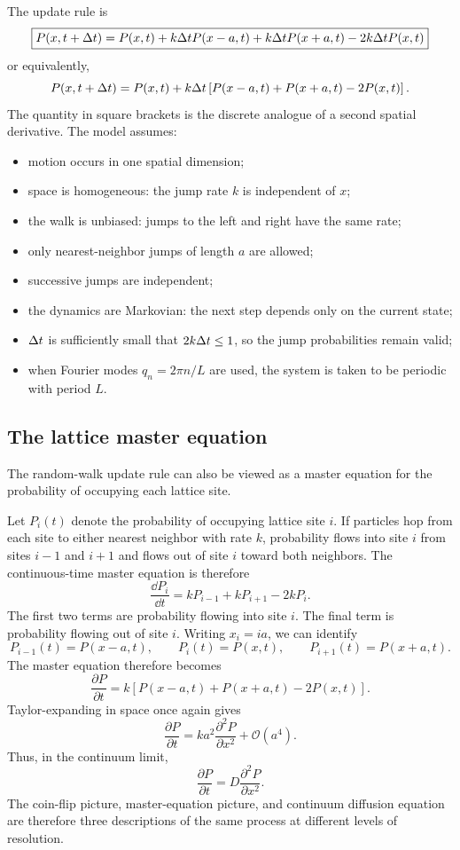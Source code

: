 The update rule is
\[
    \boxed{ P(x,t+\Delta t) = P(x,t) + k\Delta t P(x-a,t) + k\Delta t P(x+a,t) - 2k\Delta t P(x,t) }
\]
or equivalently,
\[
    P(x,t+\Delta t) = P(x,t) + k\Delta t \left[ P(x-a,t) + P(x+a,t) - 2P(x,t) \right].
\]
The quantity in square brackets is the discrete analogue of a second spatial derivative.
% 
% 
The model assumes:
\begin{itemize}
    \item motion occurs in one spatial dimension;
    \item space is homogeneous: the jump rate $k$ is independent of $x$;
    \item the walk is unbiased: jumps to the left and right have the same rate;
    \item only nearest-neighbor jumps of length $a$ are allowed;
    \item successive jumps are independent;
    \item the dynamics are Markovian: the next step depends only on the current state;
    \item $\Delta t$ is sufficiently small that $2k\Delta t\leq1$, so the jump probabilities remain valid;
    \item when Fourier modes $q_n=2\pi n/L$ are used, the system is taken to be periodic with period $L$.
\end{itemize}
% 
% 
\medskip

\subsection{The lattice master equation}
\label{sec:lattice-master}


The random-walk update rule can also be viewed as a master equation for the probability of occupying each lattice site.

Let $P_i(t)$ denote the probability of occupying lattice site $i$.
If particles hop from each site to either nearest neighbor with rate $k$, probability flows into site $i$ from sites $i-1$ and $i+1$ and flows out of site $i$ toward both neighbors.
The continuous-time master equation is therefore
% 
\[
    \boxed{\frac{\dd P_i}{\dd t} = kP_{i-1} + kP_{i+1} - 2kP_i.}
\]
% 
The first two terms are probability flowing into site $i$.
The final term is probability flowing out of site $i$.
Writing $x_i=ia$, we can identify
% 
\[
    P_{i-1}(t)=P(x-a,t), \qquad P_i(t)=P(x,t), \qquad P_{i+1}(t)=P(x+a,t).
\]
% 
The master equation therefore becomes
% 
\[
    \frac{\partial P}{\partial t} = k\left[P(x-a,t)+P(x+a,t)-2P(x,t)\right].
\]
% 
Taylor-expanding in space once again gives
% 
\[
    \frac{\partial P}{\partial t} = ka^2\frac{\partial^2P}{\partial x^2} + \mathcal{O}(a^4).
\]
% 
Thus, in the continuum limit,
% 
\[
    \boxed{\frac{\partial P}{\partial t} = D\frac{\partial^2P}{\partial x^2}.}
\]
% 
The coin-flip picture, master-equation picture, and continuum diffusion equation are therefore three descriptions of the same process at different levels of resolution.
% 
% 

